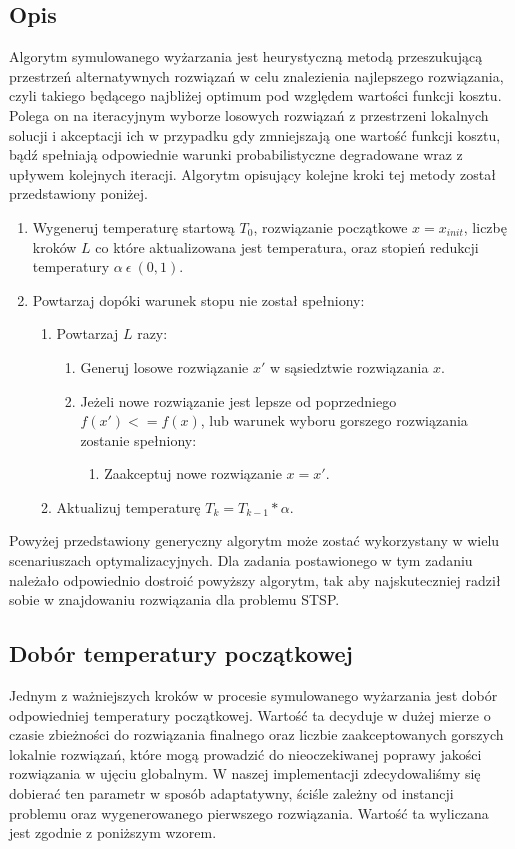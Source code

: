 \subsection{Opis}

Algorytm symulowanego wyżarzania jest heurystyczną metodą przeszukującą przestrzeń alternatywnych rozwiązań w celu znalezienia najlepszego rozwiązania, czyli takiego będącego najbliżej optimum pod względem wartości funkcji kosztu. Polega on na iteracyjnym wyborze losowych rozwiązań z przestrzeni lokalnych solucji i akceptacji ich w przypadku gdy zmniejszają one wartość funkcji kosztu, bądź spełniają odpowiednie warunki probabilistyczne degradowane wraz z upływem kolejnych iteracji. Algorytm opisujący kolejne kroki tej metody został przedstawiony poniżej.

\begin{enumerate}
	\item Wygeneruj temperaturę startową $T_0$, rozwiązanie początkowe $x = x_{init}$, liczbę kroków $L$ co które aktualizowana jest temperatura, oraz stopień redukcji temperatury $\alpha~\epsilon~(0, 1)$.
	\item Powtarzaj dopóki warunek stopu nie został spełniony:
	\begin{enumerate}
		\item Powtarzaj $L$ razy:
		\begin{enumerate}
			\item Generuj losowe rozwiązanie $x'$ w sąsiedztwie rozwiązania $x$.
			\item Jeżeli nowe rozwiązanie jest lepsze od poprzedniego $f(x') <= f(x)$, lub warunek wyboru gorszego rozwiązania zostanie spełniony:
			\begin{enumerate}
				\item Zaakceptuj nowe rozwiązanie $x = x'$.
			\end{enumerate}
		\end{enumerate}
		\item Aktualizuj temperaturę $T_k = T_{k-1} * \alpha$.
	\end{enumerate}
\end{enumerate}

Powyżej przedstawiony generyczny algorytm może zostać wykorzystany w wielu scenariuszach optymalizacyjnych. Dla zadania postawionego w tym zadaniu należało odpowiednio dostroić powyższy algorytm, tak aby najskuteczniej radził sobie w znajdowaniu rozwiązania dla problemu STSP.


\subsection{Dobór temperatury początkowej}
Jednym z ważniejszych kroków w procesie symulowanego wyżarzania jest dobór odpowiedniej temperatury początkowej. Wartość ta decyduje w dużej mierze o czasie zbieżności do rozwiązania finalnego oraz liczbie zaakceptowanych gorszych lokalnie rozwiązań, które mogą prowadzić do nieoczekiwanej poprawy jakości rozwiązania w ujęciu globalnym. W naszej implementacji zdecydowaliśmy się dobierać ten parametr w sposób adaptatywny, ściśle zależny od instancji problemu oraz wygenerowanego pierwszego rozwiązania. Wartość ta wyliczana jest zgodnie z poniższym wzorem.

